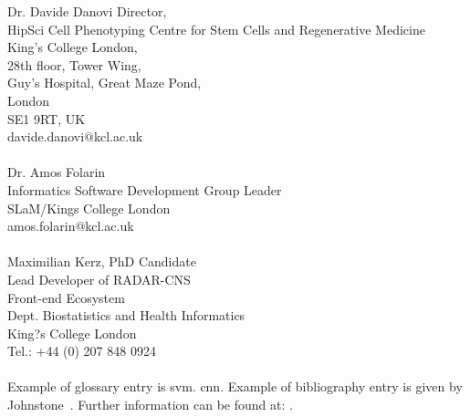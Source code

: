 {Dr. Davide Danovi Director, \\ HipSci Cell Phenotyping Centre for Stem Cells and Regenerative Medicine \\ King's College London, \\ 28th floor, Tower Wing, \\ Guy's Hospital, Great Maze Pond, \\ London \\SE1 9RT, UK \\ davide.danovi$@$kcl.ac.uk \\ \\ Dr. Amos Folarin \\ Informatics Software Development Group Leader \\ SLaM/Kings College London\\ amos.folarin$@$kcl.ac.uk \\ \\ Maximilian Kerz, PhD Candidate \\ Lead Developer of RADAR-CNS \\ Front-end Ecosystem \\ Dept. Biostatistics and Health Informatics \\ King?s College London \\ Tel.: +44 (0) 207 848 0924
}
\\ \\ 
Example of glossary entry is \gls{svm}. \gls{cnn}.
Example of bibliography entry is given by Johnstone~\cite{Joh11}.
Further information can be found at: \cite{website:fermentas-lambda}.

